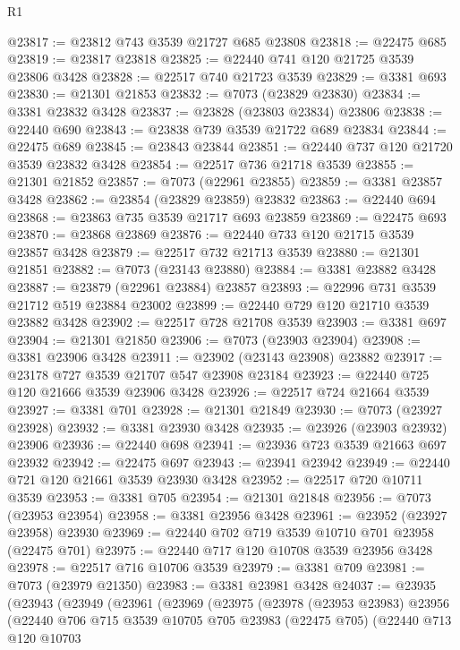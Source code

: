 \begin{lexlean}{R1}
\begin{coremodule}
@23817 := @23812 @743 @3539 @21727 @685 @23808
@23818 := @22475 @685
@23819 := @23817 @23818
@23825 := @22440 @741 @120 @21725 @3539 @23806 @3428
@23828 := @22517 @740 @21723 @3539
@23829 := @3381 @693
@23830 := @21301 @21853
@23832 := @7073 (@23829 @23830)
@23834 := @3381 @23832 @3428
@23837 := @23828 (@23803 @23834) @23806
@23838 := @22440 @690
@23843 := @23838 @739 @3539 @21722 @689 @23834
@23844 := @22475 @689
@23845 := @23843 @23844
@23851 := @22440 @737 @120 @21720 @3539 @23832 @3428
@23854 := @22517 @736 @21718 @3539
@23855 := @21301 @21852
@23857 := @7073 (@22961 @23855)
@23859 := @3381 @23857 @3428
@23862 := @23854 (@23829 @23859) @23832
@23863 := @22440 @694
@23868 := @23863 @735 @3539 @21717 @693 @23859
@23869 := @22475 @693
@23870 := @23868 @23869
@23876 := @22440 @733 @120 @21715 @3539 @23857 @3428
@23879 := @22517 @732 @21713 @3539
@23880 := @21301 @21851
@23882 := @7073 (@23143 @23880)
@23884 := @3381 @23882 @3428
@23887 := @23879 (@22961 @23884) @23857
@23893 := @22996 @731 @3539 @21712 @519 @23884 @23002
@23899 := @22440 @729 @120 @21710 @3539 @23882 @3428
@23902 := @22517 @728 @21708 @3539
@23903 := @3381 @697
@23904 := @21301 @21850
@23906 := @7073 (@23903 @23904)
@23908 := @3381 @23906 @3428
@23911 := @23902 (@23143 @23908) @23882
@23917 := @23178 @727 @3539 @21707 @547 @23908 @23184
@23923 := @22440 @725 @120 @21666 @3539 @23906 @3428
@23926 := @22517 @724 @21664 @3539
@23927 := @3381 @701
@23928 := @21301 @21849
@23930 := @7073 (@23927 @23928)
@23932 := @3381 @23930 @3428
@23935 := @23926 (@23903 @23932) @23906
@23936 := @22440 @698
@23941 := @23936 @723 @3539 @21663 @697 @23932
@23942 := @22475 @697
@23943 := @23941 @23942
@23949 := @22440 @721 @120 @21661 @3539 @23930 @3428
@23952 := @22517 @720 @10711 @3539
@23953 := @3381 @705
@23954 := @21301 @21848
@23956 := @7073 (@23953 @23954)
@23958 := @3381 @23956 @3428
@23961 := @23952 (@23927 @23958) @23930
@23969 := @22440 @702 @719 @3539 @10710 @701 @23958 (@22475 @701)
@23975 := @22440 @717 @120 @10708 @3539 @23956 @3428
@23978 := @22517 @716 @10706 @3539
@23979 := @3381 @709
@23981 := @7073 (@23979 @21350)
@23983 := @3381 @23981 @3428
@24037 := @23935
    (@23943
      (@23949
        (@23961
          (@23969
            (@23975
              (@23978
                (@23953 @23983)
                @23956
                (@22440
                  @706
                  @715
                  @3539
                  @10705
                  @705
                  @23983
                  (@22475 @705)
                  (@22440
                    @713
                    @120
                    @10703

\end{coremodule}
\end{lexlean}
